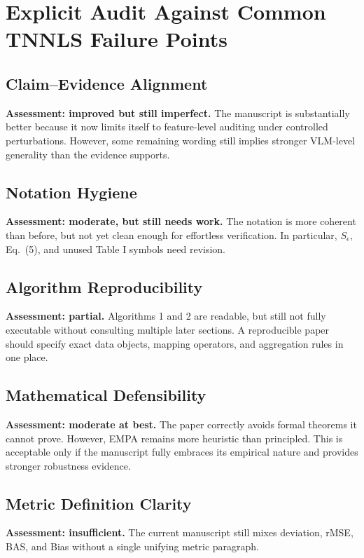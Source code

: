 \section*{Explicit Audit Against Common TNNLS Failure Points}

\subsection*{Claim--Evidence Alignment}
\textbf{Assessment: improved but still imperfect.}  
The manuscript is substantially better because it now limits itself to feature-level auditing under controlled perturbations. However, some remaining wording still implies stronger VLM-level generality than the evidence supports.

\subsection*{Notation Hygiene}
\textbf{Assessment: moderate, but still needs work.}  
The notation is more coherent than before, but not yet clean enough for effortless verification. In particular, $S_\epsilon$, Eq.~(5), and unused Table I symbols need revision.

\subsection*{Algorithm Reproducibility}
\textbf{Assessment: partial.}  
Algorithms 1 and 2 are readable, but still not fully executable without consulting multiple later sections. A reproducible paper should specify exact data objects, mapping operators, and aggregation rules in one place.

\subsection*{Mathematical Defensibility}
\textbf{Assessment: moderate at best.}  
The paper correctly avoids formal theorems it cannot prove. However, EMPA remains more heuristic than principled. This is acceptable only if the manuscript fully embraces its empirical nature and provides stronger robustness evidence.

\subsection*{Metric Definition Clarity}
\textbf{Assessment: insufficient.}  
The current manuscript still mixes deviation, rMSE, BAS, and Bias without a single unifying metric paragraph.

